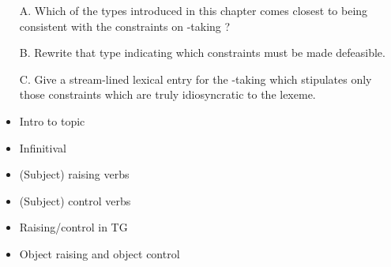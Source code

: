\documentclass[a4paper,landscape,headrule,footrule,dvips]{foils}
\begin{document}
\begin{itemize}
\item[A.] Which of the types introduced in this chapter comes
closest to being consistent with the constraints on -taking
?
\item[B.] Rewrite that type indicating which constraints must
be made defeasible.
\item[C.] Give a stream-lined lexical entry for the -taking
 which stipulates only those constraints which are truly
idiosyncratic to the lexeme.
\end{itemize}




\begin{itemize}
\item Intro to topic
\item Infinitival 
\item (Subject) raising verbs
\item (Subject) control verbs
\item Raising/control in TG
\item Object raising and object control
\end{itemize}




\end{document}
